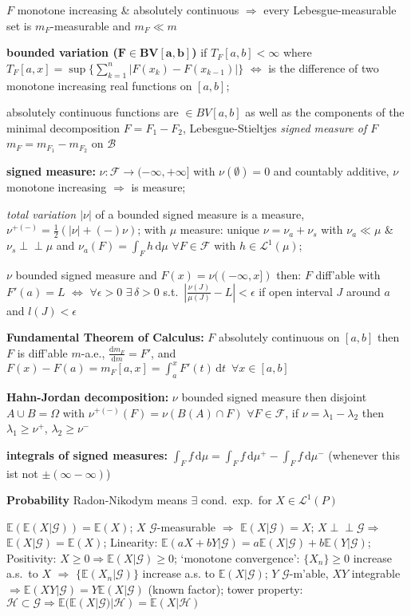 \documentclass[8pt,twoside]{extarticle}
\newcommand{\indep}{\perp \!\!\! \perp}
\begin{document}
\begin{multicols}{2}
$F$ monotone increasing \& absolutely continuous $\Rightarrow$ every Lebesgue-measurable set is $m_F$-measurable and $m_F \ll m$

\textbf{bounded variation ($\boldsymbol{F \in BV[a,b]}$)} if $T_F[a,b] <\infty$ where $T_F[a,x]=\sup \{\sum_{k=1}^n|F(x_k)-F(x_{k-1})|\}$ $\Leftrightarrow$ is the difference of two monotone increasing real functions on $[a,b]$;

absolutely continuous functions are $\in BV[a,b]$ as well as the components of the minimal decomposition  $F=F_1-F_2$, Lebesgue-Stieltjes \textit{signed measure of $F$} $m_F=m_{F_1}-m_{F_2}$ on $\mathcal{B}$

\textbf{signed measure:} $\nu:\mathcal{F}\to (-\infty,+\infty]$ with $\nu(\emptyset)=0$ and countably additive, $\nu$ monotone increasing $\Rightarrow$ is measure;

\textit{total variation $|\nu|$} of a bounded signed measure is a measure, $\nu^{+(-)}=\frac{1}{2} (|\nu| {+}(-) \nu)$; with $\mu$ measure: unique $\nu=\nu_a + \nu_s$ with $\nu_a\ll\mu$ \& $\nu_s\indep \mu$ and $\nu_a(F)=\int_Fh\,\mathrm{d}\mu \,\,\forall F{\in}\mathcal{F}$ with $h\in \mathcal{L}^1(\mu)$;

$\nu$ bounded signed measure and $F(x)=\nu((-\infty,x])$ then: $F$ diff'able with $F'(a)=L$ $\Leftrightarrow$ $\forall \epsilon{>}0\,\, \exists \,\delta {>} 0$ s.t.\ $|\frac{\nu(J)}{\mu(J)} - L|<\epsilon$ if open interval $J$ around $a$ and $l(J)<\epsilon$

\textbf{Fundamental Theorem of Calculus:} $F$ absolutely continuous on $[a,b]$ then $F$ is diff'able $m$-a.e., $\frac{\mathrm{d}m_F}{\mathrm{d}m} = F'$, and $F(x)-F(a) = m_F[a,x]=\int_a^x F'(t)\,\mathrm{d}t \,\,\, \forall x\in[a,b]$

\textbf{Hahn-Jordan decomposition:} $\nu$ bounded signed measure then disjoint $A\cup B=\Omega$ with $\nu^{+(-)}(F)=\nu(B(A)\cap F) \,\,\forall F{\in}\mathcal{F}$,
 if $\nu=\lambda_1-\lambda_2$ then $\lambda_1\geq \nu^+$, $\lambda_2\geq \nu^-$
 
\textbf{integrals of signed measures:} $\int_F f \,\mathrm{d}\mu = \int_F f \,\mathrm{d}\mu^+ - \int_F f \,\mathrm{d}\mu^-$ (whenever this ist not $\pm(\infty-\infty)$)

\textbf{Probability} Radon-Nikodym means $\exists$ cond.\ exp.\ for $X\in \mathcal{L}^1(P)$

$\mathbb{E}(\mathbb{E}(X|\mathcal{G}))=\mathbb{E}(X)$; 
$X$ $\mathcal{G}$-measurable $\Rightarrow$ $\mathbb{E}(X|\mathcal{G})=X$; 
$X\indep \mathcal{G} \Rightarrow$ $\mathbb{E}(X|\mathcal{G})=\mathbb{E}(X)$; 
Linearity: $\mathbb{E}(aX+bY|\mathcal{G}) = a\mathbb{E}(X|\mathcal{G}) + b\mathbb{E}(Y|\mathcal{G})$; 
Positivity: $X \geq 0 \Rightarrow\mathbb{E}(X|\mathcal{G})\geq 0$; 
`monotone convergence': $\{X_n\}\geq 0$ increase a.s.\ to $X$ $\Rightarrow$ $\{\mathbb{E}(X_n|\mathcal{G})\}$ increase a.s. to $\mathbb{E}(X|\mathcal{G})$; $Y$ $\mathcal{G}$-m'able, $XY$ integrable $\Rightarrow \mathbb{E}(XY|\mathcal{G}) = Y\mathbb{E}(X|\mathcal{G})$ (known factor); tower property: $\mathcal{H}{\subset}\mathcal{G} \Rightarrow \mathbb{E}(\mathbb{E}(X|\mathcal{G})|\mathcal{H})=\mathbb{E}(X|\mathcal{H})$


\end{multicols}
\end{document}
